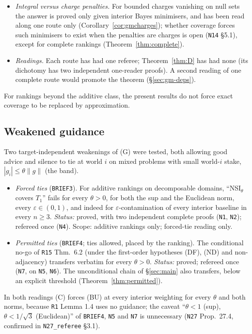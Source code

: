 \documentclass[11pt]{article}
\theoremstyle{definition}
\theoremstyle{remark}
\newcommand{\src}[1]{\texttt{#1}}
\begin{document}
\begin{enumerate}[leftmargin=*,label=\textbf{(Q\arabic*)}]
\begin{itemize}[leftmargin=*]
\item \emph{Integral versus charge penalties.} For bounded charges vanishing on null sets the answer is proved only given interior Bayes minimisers, and has been read along one route only (Corollary~\ref{cor:gmcharges}); whether coverage forces such minimisers to exist when the penalties are charges is open (\src{N14} \S5.1), except for complete rankings (Theorem~\ref{thm:complete}).
\item \emph{Readings.} Each route has had one referee; Theorem~\ref{thm:D} has had none (its dichotomy has two independent one-reader proofs). A second reading of one complete route would promote the theorem (\S\ref{sec:gm-deps}).
\end{itemize}
\end{enumerate}
For rankings beyond the additive class, the present results do not force exact coverage to be replaced by approximation.

\subsection{Weakened guidance}\label{sec:open-ties}
Two target-independent weakenings of (G) were tested, both allowing good advice and silence to tie at world $i$ on mixed problems with small world-$i$ stake, $|g_i|\le\theta\|g\|$ (the band).
\begin{itemize}[leftmargin=*]
\item \emph{Forced ties} (\src{BRIEF3}). For additive rankings on decomposable domains, ``NSI$_\theta$ covers $T_1$'' fails for every $\theta>0$, for both the sup and the Euclidean norm, every $\varepsilon\in(0,1)$, and indeed for $\varepsilon$-contamination of every interior baseline in every $n\ge3$. \emph{Status:} proved, with two independent complete proofs (\src{N1}, \src{N2}); refereed once (\src{N4}). Scope: additive rankings only; forced-tie reading only.
\item \emph{Permitted ties} (\src{BRIEF4}; ties allowed, placed by the ranking). The conditional no-go of \src{R15} Thm.~6.2 (under the first-order hypotheses (DF), (ND) and non-adjacency) transfers verbatim for every $\theta>0$. \emph{Status:} proved; refereed once (\src{N7}, on \src{N5}, \src{N6}). The unconditional chain of \S\ref{sec:main} also transfers, below an explicit threshold (Theorem~\ref{thm:permitted}).
\end{itemize}
In both readings (C) forces (BU) at every interior weighting for every $\theta$ and both norms, because \src{R1} Lemma 1.4 uses no guidance; the caveat ``$\theta<1$ (sup), $\theta<1/\sqrt3$ (Euclidean)'' of \src{BRIEF4}, \src{N5} and \src{N7} is unnecessary (\src{N27} Prop.~27.4, confirmed in \src{N27\_referee} \S3.1).
\end{document}
